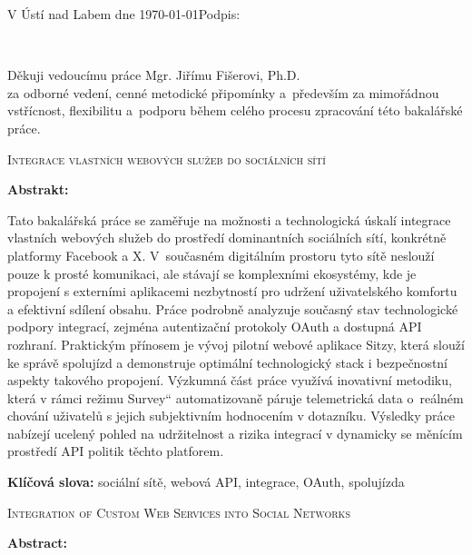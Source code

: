 \documentclass[male,czech,api_bc]{kitheses}
\newcommand{\nazevcz}{Integrace vlastních webových služeb do sociálních sítí}        %
\newcommand{\nazeven}{Integration of Custom Web Services into Social Networks}     %
\newcommand{\vedouciDAT}{Mgr. Jiřímu Fišerovi, Ph.D.}
\newcommand{\UV}[1]{\quotedblbase#1\textquotedblleft}
\begin{document}
\vspace{2em}

V Ústí nad Labem dne \today   \hfill Podpis: \makebox[4cm][s]{\dotfill}

\cleardoublepage
\thispagestyle{empty}
~
\vfill

\begin{flushright}
    Děkuji vedoucímu práce \vedouciDAT\\ 
    za odborné vedení, cenné metodické připomínky a~především za mimořádnou vstřícnost, flexibilitu a~podporu během celého procesu zpracování této bakalářské práce.
\end{flushright}

\cleardoublepage

\textsc{\nazevcz}

\textbf{Abstrakt:}

Tato bakalářská práce se zaměřuje na možnosti a technologická úskalí integrace vlastních webových služeb do prostředí dominantních sociálních sítí, konkrétně platformy Facebook a X. V~současném digitálním prostoru tyto sítě neslouží pouze k prosté komunikaci, ale stávají se komplexními ekosystémy, kde je propojení s externími aplikacemi nezbytností pro udržení uživatelského komfortu a efektivní sdílení obsahu. Práce podrobně analyzuje současný stav technologické podpory integrací, zejména autentizační protokoly OAuth a dostupná API rozhraní. Praktickým přínosem je vývoj pilotní webové aplikace Sitzy, která slouží ke správě spolujízd a demonstruje optimální technologický stack i bezpečnostní aspekty takového propojení. Výzkumná část práce využívá inovativní metodiku, která v rámci režimu \UV{Survey} automatizovaně páruje telemetrická data o~reálném chování uživatelů s jejich subjektivním hodnocením v dotazníku. Výsledky práce nabízejí ucelený pohled na udržitelnost a rizika integrací v dynamicky se měnícím prostředí API politik těchto platforem.

\textbf{Klíčová slova:} sociální sítě, webová API, integrace, OAuth, spolujízda

\bigskip


\textsc{\nazeven}

\textbf{Abstract:}
\end{document}
